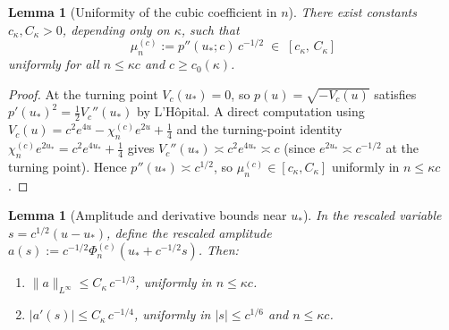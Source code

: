 \documentclass[12pt,a4paper]{amsart}
\newtheorem{lemma}[theorem]{Lemma}
\theoremstyle{definition}
\theoremstyle{remark}
\newcommand{\ustar}{u_*}
\begin{document}
\begin{lemma}[Uniformity of the cubic coefficient in $n$]
\label{lem:uniform-n}
There exist constants $c_\kappa, C_\kappa > 0$,
depending only on $\kappa$, such that
\[
  \mu_n^{(c)} := p''(\ustar;c)\,c^{-1/2}
  \;\in\; [c_\kappa,\, C_\kappa]
\]
uniformly for all $n \le \kappa c$ and $c \ge c_0(\kappa)$.
\end{lemma}

\begin{proof}
At the turning point $V_c(\ustar) = 0$, so
$p(u) = \sqrt{-V_c(u)}$ satisfies
$p'(\ustar)^2 = \tfrac{1}{2}V_c''(\ustar)$
by L'H\^opital.
A direct computation using
$V_c(u) = c^2 e^{4u} - \chi_n^{(c)} e^{2u} + \tfrac{1}{4}$
and the turning-point identity
$\chi_n^{(c)} e^{2\ustar} = c^2 e^{4\ustar} + \tfrac{1}{4}$
gives $V_c''(\ustar) \asymp c^2 e^{4\ustar} \asymp c$
(since $e^{2\ustar} \asymp c^{-1/2}$ at the turning point).
Hence $p''(\ustar) \asymp c^{1/2}$,
so $\mu_n^{(c)} \in [c_\kappa, C_\kappa]$
uniformly in $n \le \kappa c$.
\end{proof}

\begin{lemma}[Amplitude and derivative bounds near $\ustar$]
\label{lem:amp-near}
In the rescaled variable $s = c^{1/2}(u - \ustar)$,
define the rescaled amplitude
$a(s) := c^{-1/2}\Phi_n^{(c)}(\ustar + c^{-1/2}s)$.
Then:
\begin{enumerate}[\rm(i)]
  \item $\|a\|_{L^\infty} \le C_\kappa\,c^{-1/3}$,
        uniformly in $n \le \kappa c$.
  \item $|a'(s)| \le C_\kappa\,c^{-1/4}$,
        uniformly in $|s| \le c^{1/6}$ and $n \le \kappa c$.
\end{enumerate}
\end{lemma}
\end{document}
